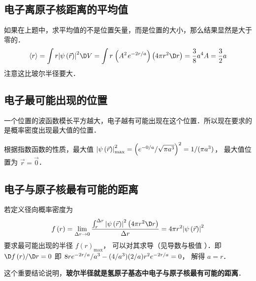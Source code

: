 \subsection{电子离原子核距离的平均值}

如果在上题中，求平均值的不是位置矢量，而是位置的大小，那么结果显然是大于零的．
\begin{equation}
 \left\langle r \right\rangle = \int {r{{\left| {\psi \left( {\vec r} \right)} \right|}^2} \D V} = \int {r{\kern 1pt} \left( {{A^2}{\kern 1pt} {e^{ - {{2r} \mathord{\left/
 {\vphantom {{2r} a}} \right.
 \kern-\nulldelimiterspace} a}}}} \right)\left( {4\pi {r^2} \D r} \right)}= \frac{3}{8}{a^4}A = \frac{3}{2}a
\end{equation}
注意这比玻尔半径要大．

\subsection{电子最可能出现的位置}

 一个位置的波函数模长平方越大，电子越有可能出现在这个位置．所以现在要求的是概率密度出现最大值的位置．
 
 根据指数函数的性质，最大值 $\left| {\psi \left( {\vec r} \right)} \right|_{\max }^2 ={\left( {e^{ - {0 \mathord{\left/{\vphantom {0 a}} \right.
 \kern-\nulldelimiterspace} a}}}/{{\sqrt {\pi {a^3}} }} \right)^2} = {1}/({{\pi {a^3}}})$， 最大值位置为 $\vec r = \vec 0$． 

\subsection{电子与原子核最有可能的距离}
  若定义径向概率密度为
  \begin{equation}
    f\left( r \right) = \mathop {\lim }\limits_{\Delta r \to 0} \frac{{\int_r^{\Delta r} {{{\left| {\psi \left( {\vec r} \right)} \right|}^2}\left( {4\pi {r^2} \D r} \right)} }}{{\Delta r}} = 4\pi {r^2}{\left| {\psi \left( {\vec r} \right)} \right|^2}
  \end{equation}
  要求最可能出现的半径 $f{\left( r \right)_{\max }}$，  可以对其求导（见导数与极值%
  ）．即 ${{ \D f\left( r \right)}}/{{ \D r}} = 0$ 即 ${8 r{e^{{{ - 2r} \mathord{\left/
 {\vphantom {{ - 2r} a}} \right.
 \kern-\nulldelimiterspace} a}}}}/{{{a^3}}} - ({4}/{{{a^3}}})({2}/{a}){r^2}{e^{{{ - 2r} \mathord{\left/
 {\vphantom {{ - 2r} a}} \right.
 \kern-\nulldelimiterspace} a}}} = 0$， 解得 $a = r$． 
 
这个重要结论说明，\textbf{玻尔半径就是氢原子基态中电子与原子核最有可能的距离}．
